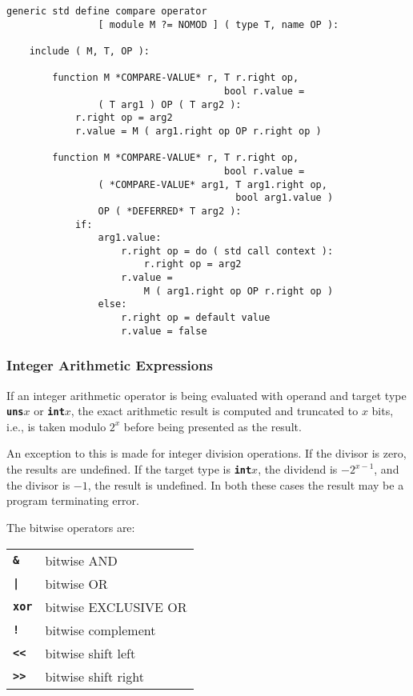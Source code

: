 \documentclass[12pt]{article}
\newcommand{\TT}[1]{{\tt \bfseries #1}}
\newenvironment{indpar}[1][0.3in]%
	{\begin{list}{}%
		     {\setlength{\itemsep}{0in}%
		      \setlength{\topsep}{0in}%
		      \setlength{\parsep}{1ex}%
		      \setlength{\labelwidth}{#1}%
		      \setlength{\leftmargin}{#1}%
		      \addtolength{\leftmargin}{\labelsep}}%
	 \item}%
	{\end{list}}
\begin{document}
\label{DEFINE-COMPARE-OPERATOR}%
\begin{indpar}\begin{verbatim}
generic std define compare operator
                [ module M ?= NOMOD ] ( type T, name OP ):

    include ( M, T, OP ):

        function M *COMPARE-VALUE* r, T r.right op,
                                      bool r.value =
                ( T arg1 ) OP ( T arg2 ):
            r.right op = arg2
            r.value = M ( arg1.right op OP r.right op )

        function M *COMPARE-VALUE* r, T r.right op,
                                      bool r.value =
                ( *COMPARE-VALUE* arg1, T arg1.right op,
                                        bool arg1.value )
                OP ( *DEFERRED* T arg2 ):
            if:
                arg1.value:
                    r.right op = do ( std call context ):
                        r.right op = arg2
                    r.value =
                        M ( arg1.right op OP r.right op )
                else:
                    r.right op = default value
                    r.value = false
\end{verbatim}\end{indpar}

\subsubsection{Integer Arithmetic Expressions}

If an integer arithmetic operator is being evaluated with
operand and target type \TT{uns$x$} or \TT{int$x$}, the
exact arithmetic result is computed and truncated to
$x$ bits, i.e., is taken modulo $2^x$ before being presented
as the result.

An exception to this is made for integer division operations.
If the divisor is zero, the results are undefined.  If the
target type is \TT{int$x$}, the dividend is $-2^{x-1}$, and
the divisor is $-1$, the result is undefined.  In both these
cases the result may be a program terminating error.

The bitwise operators are:
\begin{center}
\begin{tabular}{ll}
\TT{\&}		& bitwise AND \\
\TT{|}		& bitwise OR \\
\TT{xor}	& bitwise EXCLUSIVE OR \\
\TT{!}		& bitwise complement \\
\TT{<{}<}	& bitwise shift left \\
\TT{>{}>}	& bitwise shift right \\
\end{tabular}
\end{center}
\end{document}
